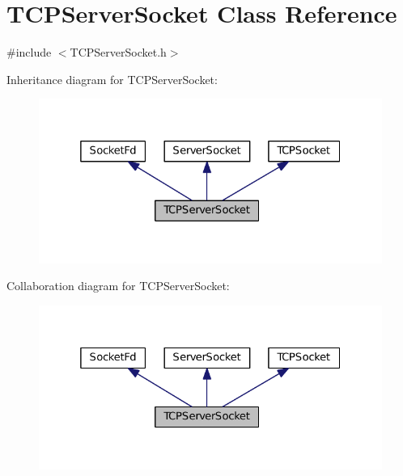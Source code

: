 \hypertarget{classTCPServerSocket}{\section{T\+C\+P\+Server\+Socket Class Reference}
\label{classTCPServerSocket}
}


{\ttfamily \#include $<$T\+C\+P\+Server\+Socket.\+h$>$}



Inheritance diagram for T\+C\+P\+Server\+Socket\+:
\nopagebreak
\begin{figure}[H]
\begin{center}
\leavevmode
\includegraphics[width=325pt]{classTCPServerSocket__inherit__graph}
\end{center}
\end{figure}


Collaboration diagram for T\+C\+P\+Server\+Socket\+:
\nopagebreak
\begin{figure}[H]
\begin{center}
\leavevmode
\includegraphics[width=325pt]{classTCPServerSocket__coll__graph}
\end{center}
\end{figure}
